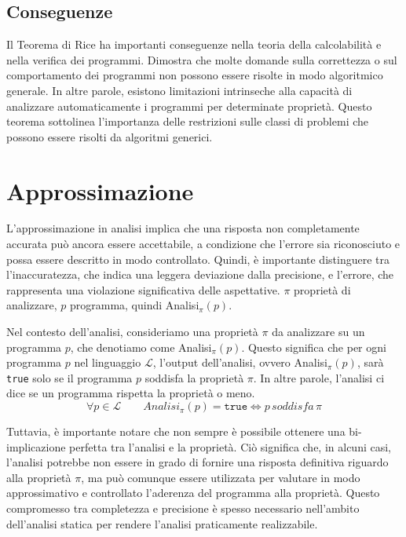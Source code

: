 \subsection{Conseguenze}

Il Teorema di Rice ha importanti conseguenze nella teoria della calcolabilità e nella
verifica dei programmi. Dimostra che molte domande sulla correttezza o sul comportamento
dei programmi non possono essere risolte in modo algoritmico generale. In altre parole, esistono
limitazioni intrinseche alla capacità di analizzare automaticamente i programmi per determinate proprietà.
Questo teorema sottolinea l'importanza delle restrizioni sulle classi di problemi che possono essere risolti
da algoritmi generici.

\section{Approssimazione}
L'approssimazione in analisi implica che una risposta non completamente accurata
può ancora essere accettabile, a condizione che l'errore sia riconosciuto e possa essere
descritto in modo controllato. Quindi, è importante distinguere tra l'inaccuratezza,
che indica una leggera deviazione dalla precisione,
e l'errore, che rappresenta una violazione significativa delle aspettative.
$\pi$ proprietà di analizzare, $p$ programma, quindi Analisi$_{\pi}(p)$.

Nel contesto dell'analisi, consideriamo una proprietà $\pi$ da analizzare su un programma $p$,
che denotiamo come Analisi$_{\pi}(p)$. Questo significa che per ogni programma $p$ nel linguaggio
$\mathcal{L}$, l'output dell'analisi, ovvero Analisi$_{\pi}(p)$, sarà \texttt{true} solo se il programma
$p$ soddisfa la proprietà $\pi$. In altre parole, l'analisi ci dice se un programma rispetta la proprietà o meno.
\[
    \forall p \in \mathcal{L}\qquad
    Analisi_{\pi}(p) = \texttt{true} \iff p \, \textit{soddisfa} \,\pi
\]

Tuttavia, è importante notare che non sempre è possibile ottenere una bi-implicazione
perfetta tra l'analisi e la proprietà. Ciò significa che, in alcuni casi, l'analisi potrebbe
non essere in grado di fornire una risposta definitiva riguardo alla proprietà $\pi$, ma può
comunque essere utilizzata per valutare in modo approssimativo e controllato l'aderenza del programma
alla proprietà. Questo compromesso tra completezza e precisione è spesso
necessario nell'ambito dell'analisi statica per rendere l'analisi praticamente realizzabile.

